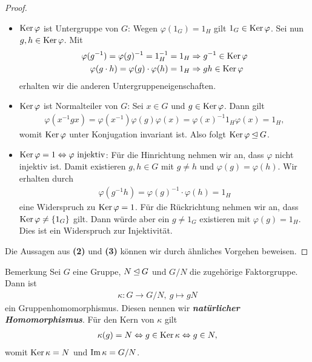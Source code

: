 \begin{proof}\
\begin{itemize}
\item $\operatorname{Ker} \varphi$ ist Untergruppe von $G$: Wegen $\varphi(1_G) = 1_H$ gilt $1_G \in \operatorname{Ker} \varphi$.
Sei nun $g,h \in \operatorname{Ker} \varphi$.
Mit
\begin{align*}
\varphi(g^{-1}) =\varphi(g)^{-1} = 1_H^{-1} = 1_H &\Rightarrow g^{-1} \in \operatorname{Ker} \varphi\\
\varphi(g\cdot h) = \varphi(g) \cdot \varphi(h) = 1_H  &\Rightarrow gh \in \operatorname{Ker} \varphi 
\end{align*}
erhalten wir die anderen Untergruppeneigenschaften.
\item $\operatorname{Ker} \varphi$ ist Normalteiler von $G$: 
Sei $x \in G$ und $g \in \operatorname{Ker} \varphi$.
Dann gilt
\begin{align*}
\varphi(x^{-1} g x ) = \varphi(x^{-1}) \varphi(g) \varphi(x) = \varphi(x)^{-1} 1_H \varphi(x) = 1_H,
\end{align*}
womit $\operatorname{Ker} \varphi$ unter Konjugation invariant ist. Also folgt $\operatorname{Ker} \varphi \unlhd G$. 
\item $\operatorname{Ker} \varphi = 1 \Leftrightarrow \varphi \ \text{injektiv}$: 
Für die Hinrichtung nehmen wir an, dass $\varphi$ nicht injektiv ist.
Damit existieren $g,h \in G$ mit $g \neq h$ und $\varphi(g) = \varphi(h)$.
Wir erhalten durch 
\begin{align*}
\varphi(g^{-1}h) = \varphi(g)^{-1} \cdot \varphi(h) = 1_H
\end{align*}
eine Widerspruch zu $\operatorname{Ker} \varphi = 1$. Für die Rückrichtung nehmen wir an, dass $\operatorname{Ker} \varphi \neq \lbrace 1_G \rbrace$ gilt. Dann würde aber ein $g \neq 1_G$ existieren mit $\varphi(g) = 1_H$.
Dies ist ein Widerspruch zur Injektivität.
\end{itemize}
Die Aussagen aus \textbf{(2)} und \textbf{(3)} können wir durch ähnliches Vorgehen beweisen.
\end{proof}

\begin{genericdf}{Bemerkung}\label{3.6} 
	Sei $ G $ eine Gruppe, $ N \unlhd G$ und $ G/N $ die zugehörige Faktorgruppe. Dann ist 
	\begin{align*}
	\kappa : G \to G/N, \ g \mapsto gN
	\end{align*}
	ein Gruppenhomomorphismus. Diesen nennen wir \textit{\textbf{natürlicher Homomorphismus}}.
	Für den Kern von $ \kappa $ gilt
	\begin{align*}
	\kappa(g) = N \Leftrightarrow g \in \operatorname{Ker} \kappa \Leftrightarrow g \in N,
	\end{align*}
	womit $ \operatorname{Ker} \kappa  = N $ und $ \operatorname{Im} \kappa = G/ N $.
	
\end{genericdf}

